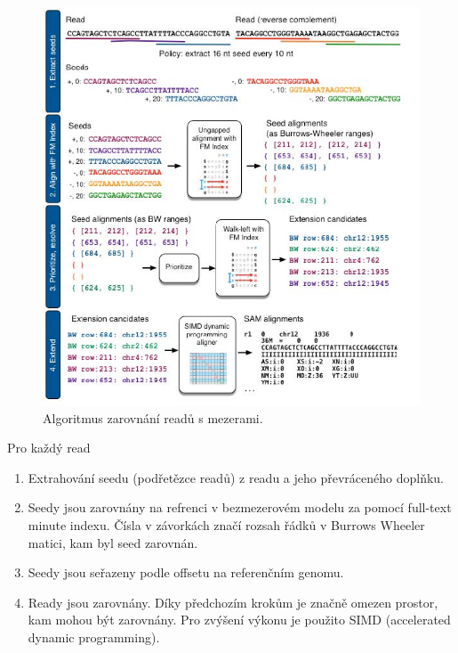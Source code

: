 \documentclass[czech,DP]{thesiskiv}
\numberwithin{equation}{section}
\begin{document}
\begin{figure}[H]		
		\centering
		\includegraphics[width=1\textwidth]{./img/bowtie2_postup.png}
		\caption{Algoritmus zarovnání readů s mezerami. \cite{bowtie2}}
		\label{fig:bowtie_postup}
\end{figure}


\noindent
Pro každý read
\begin{enumerate}
	\item Extrahování seedu (podřetězce readů) z readu a jeho převráceného doplňku. 
	\item Seedy jsou zarovnány na refrenci v bezmezerovém modelu za pomocí full-text minute indexu. Čísla v závorkách značí rozsah řádků v Burrows Wheeler matici, kam byl seed zarovnán.
	\item Seedy jsou seřazeny podle offsetu na referenčním genomu. 
	\item Ready jsou zarovnány. Díky předchozím krokům je značně omezen prostor, kam mohou být zarovnány. Pro zvýšení výkonu je použito SIMD (accelerated dynamic programming).
\end{enumerate}
  
\end{document}
